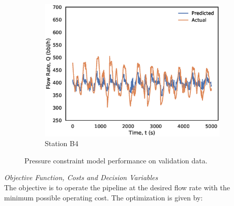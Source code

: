 \begin{figure}
\begin{subfigure}[b]{0.325\textwidth}
         \includegraphics[width=\textwidth]{images/suncor/08FL_Pconst.eps}
         \caption{Station B4}
         \label{fig:08FL_Pconst}
    \end{subfigure}
    \caption{Pressure constraint model performance on validation data.}
    \label{fig:08Pconst}
\end{figure}

\noindent
\textit{Objective Function, Costs and Decision Variables} \\
The objective is to operate the pipeline at the desired flow rate with the minimum possible operating cost.  The optimization is given by:

